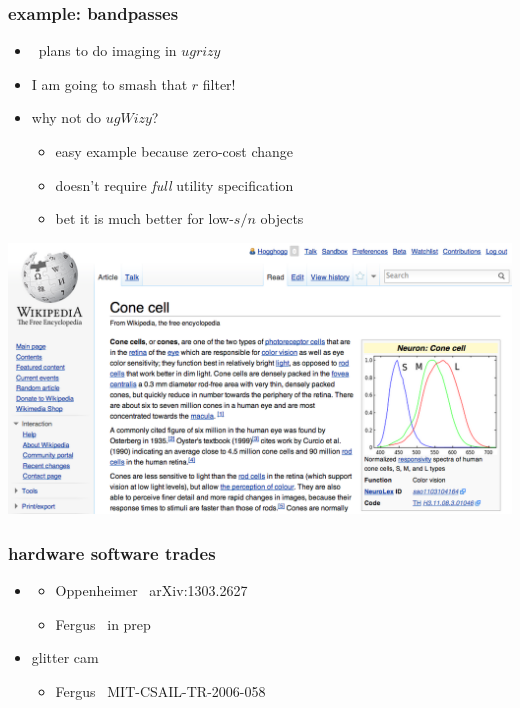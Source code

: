 \documentclass[pdftex]{beamer}
\begin{document}
\begin{frame}
  \frametitle{example: bandpasses}
  \begin{itemize}
  \item \lsst\ plans to do imaging in $ugrizy$
  \item I am going to smash that $r$ filter!
  \item why not do $ugWizy$?
    \begin{itemize}
    \item easy example because zero-cost change
    \item doesn't require \emph{full} utility specification
    \item bet it is much better for low-$s/n$ objects
    \end{itemize}
  \end{itemize}
\end{frame}

\begin{frame}
\includegraphics[width=1.05\textwidth]{conecell.png}
\end{frame}

\begin{frame}
  \frametitle{hardware  software trades}
  \begin{itemize}
  \item {}
    \begin{itemize}
    \item Oppenheimer \etal\ arXiv:1303.2627
    \item Fergus \etal\ in prep
    \end{itemize}
  \item glitter cam
    \begin{itemize}
    \item Fergus \etal\ MIT-CSAIL-TR-2006-058
    \end{itemize}
  \end{itemize}
\end{frame}
\end{document}
